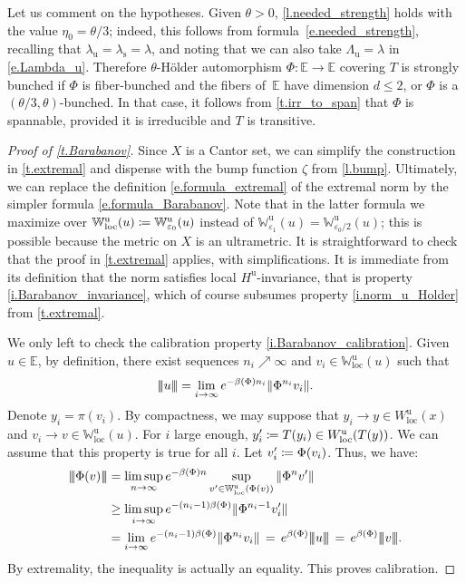 \documentclass[10pt]{amsart}
\def\vcentcolon{\mathrel{\mathop\ordinarycolon}}
\providecommand\ordinarycolon{:}
\providecommand*\coloneqq{\vcentcolon\mathrel{\mkern-1.2mu}=}
\theoremstyle{plain}
\theoremstyle{definition}
\newcommand{\tribar}[1]{\mathopen{| {\kern -1.5pt} | {\kern -1.5pt} |} {#1}
\mathclose{| {\kern -1.5pt} | {\kern -1.5pt} |}}
\newcommand{\EE}{\mathbb{E}}
\newcommand{\WW}{\mathbb{W}}
\newcommand{\uu}{\mathrm{u}}
\renewcommand{\ss}{\mathrm{s}}
\let\epsilon\varepsilon
\begin{document}
Let us comment on the hypotheses.
Given $\theta>0$, \cref{l.needed_strength} holds with the value $\eta_0 = \theta/3$; indeed, this follows from formula~\eqref{e.needed_strength}, recalling that $\lambda_\uu = \lambda_\ss = \lambda$, and noting that we can also take $\Lambda_\uu = \lambda$ in \eqref{e.Lambda_u}.
Therefore $\theta$-Hölder automorphism $\Phi \colon \EE \to \EE$ covering $T$ is strongly bunched
if $\Phi$ is fiber-bunched and the fibers of~$\EE$ have dimension $d \le 2$, or $\Phi$ is a $(\theta/3,\theta)$-bunched.
In that case, it follows from \cref{t.irr_to_span} that $\Phi$ is spannable, provided it is irreducible and $T$ is transitive.

\begin{proof}[Proof of \cref{t.Barabanov}]
Since $X$ is a Cantor set, we can simplify the construction in \cref{t.extremal} and dispense with the bump function $\zeta$ from \cref{l.bump}. Ultimately, we can replace the definition \eqref{e.formula_extremal} of the extremal norm by the simpler formula \eqref{e.formula_Barabanov}.
Note that in the latter formula we maximize over $\WW^{\uu}_{\mathrm{loc}}(u) \coloneqq \WW^\uu_{\epsilon_0}(u)$ instead of $\WW^\uu_{\epsilon_1}(u) = \WW^\uu_{\epsilon_0/2}(u)$; this is possible because the metric on $X$ is an ultrametric.
It is straightforward to check that the proof in \cref{t.extremal} applies, with simplifications.
It is immediate from its definition that the norm satisfies local $H^{\uu}$-invariance, that is property \eqref{i.Barabanov_invariance}, which of course subsumes property \eqref{i.norm_u_Holder} from \cref{t.extremal}.
		
We only left to check the calibration property \eqref{i.Barabanov_calibration}.
Given $ u \in \EE$, by definition, there exist sequences $n_i \nearrow \infty$ and $ v_i \in \WW^{\uu}_\mathrm{loc}(u) $
such that
\[
\tribar{u} = \lim_{i\to\infty} e^{-\beta(\Phi) n_i} \| \Phi^{n_i}v_i \|.
\]
Denote $ y_i = \pi(v_i) $. By compactness, we may suppose that $ y_i \to y \in W^{\uu}_{\mathrm{loc}}(x) $ and $ v_i \to v \in \WW^{\uu}_\mathrm{loc}(u) $.
For $ i $ large enough, $y'_i \coloneqq T(y_i) \in W^{\uu}_{\mathrm{loc}}(T(y))$. We can assume that this property is true for all $i$.
Let $ v'_i \coloneqq \Phi(v_i) $. Thus, we have:
\begin{align*}
\tribar{\Phi(v)}
&= \limsup_{n\to \infty} e^{- \beta(\Phi) n} \sup_{v' \in \WW^{\uu}_{\mathrm{loc}}(\Phi(v))} \| \Phi^n v' \| \\
&\ge \limsup_{i \to \infty} e^{-(n_i-1) \beta(\Phi) } \| \Phi^{n_i-1}v'_i \| \\
&= \lim_{i \to \infty} e^{-(n_i-1) \beta(\Phi) } \| \Phi^{n_i}v_i \| \, = \, e^{\beta(\Phi)} \tribar{u} \, = \, e^{\beta(\Phi)} \tribar{v}.
\end{align*}
By extremality, the inequality is actually an equality.
This proves calibration.
\end{proof}
\end{document}
